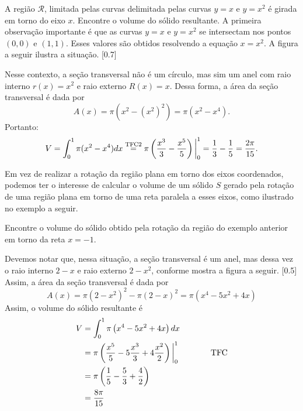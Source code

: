 \begin{example}
  A região $\mathcal{R}$, limitada pelas curvas delimitada pelas curvas
  $y = x$ e $y = x^2$ é girada em torno do eixo $x$. Encontre o volume do
  sólido resultante.
  \solution
  A primeira observação importante é que as curvas $y = x$ e $y = x^2$
  se intersectam nos pontos $(0, 0)$ e $(1, 1)$. Esses valores são obtidos
  resolvendo a equação $x = x^2$. A figura a seguir ilustra a situação.
  [0.7]

  Nesse contexto, a seção transversal não é um círculo, mas sim um anel
  com raio interno $r(x) = x^2$ e raio externo $R(x) = x$.
  Dessa forma, a área da seção transversal é dada por
  \[
    A(x)
    = \pi \left( x^2 - \left(x^2\right)^2 \right)
    = \pi \left( x^2 - x^4 \right).
  \]
  Portanto:
  \[
    V
    = \int_0^1 \pi (x^2-x^4) dx
    \stackrel{\text{\scriptsize TFC2}}{=} \pi \left( \frac{x^3}{3}-\frac{x^5}{5} \right) \bigg\rvert_{0}^{1}
    = \frac{1}{3} - \frac{1}{5}
    = \frac{2\pi}{15} .
    \]
\end{example}

Em vez de realizar a rotação da região plana em torno dos eixos coordenados,
podemos ter o interesse de calcular o volume de um sólido $S$ gerado pela
rotação de uma região plana em torno de uma reta paralela a esses eixos,
como ilustrado no exemplo a seguir.

\begin{example}
  Encontre o volume do sólido obtido pela rotação da região do
  exemplo anterior em torno da reta $x=-1$.

  \solution
  Devemos notar que, nessa situação, a seção transversal é um anel,
  mas dessa vez o raio interno $2-x$ e raio externo $2-x^2$,
  conforme mostra a figura a seguir.
  [0.5]
  Assim, a área da seção transversal é dada por
  \[
    A(x)
    = \pi \left( 2 - x^2 \right)^2 - \pi (2-x)^2
    = \pi \left( x^4-5x^2+4x \right)
  \]
  Assim, o volume do sólido resultante é
  \begin{align*}
    V
    & = \int_0^1 \pi \left( x^4 - 5x^2 + 4x \right) dx \\
    & = \pi \left(
          \frac{x^5}{5} - 5 \frac{x^3}{3} + 4 \frac{x^2}{2}
        \right) \bigg\rvert_{0}^{1} \qquad\qquad\text{TFC} \\
    & = \pi \left(\frac{1}{5} - \frac{5}{3} + \frac{4}{2}\right) \\
    & = \frac{8\pi}{15}
  \end{align*}
\end{example}

